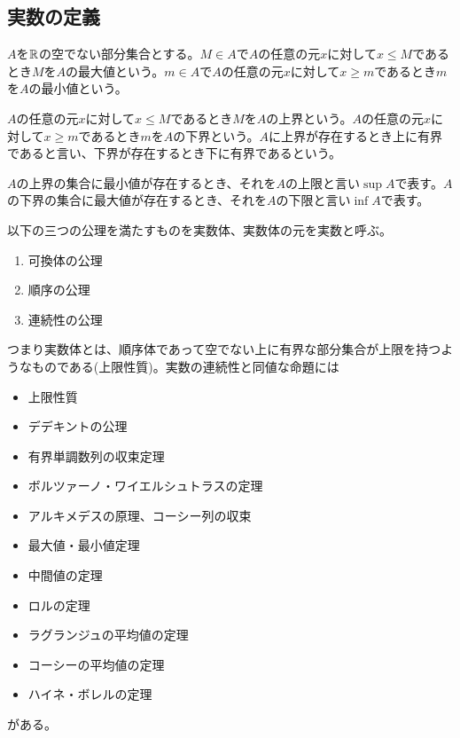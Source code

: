 \subsection{実数の定義}
	\begin{dfn}
		$A$を$\mathbb{R}$の空でない部分集合とする。$M \in A$で$A$の任意の元$x$に対して$x \leq M$であるとき$M$を$A$の最大値という。$m \in A$で$A$の任意の元$x$に対して$x \geq m$であるとき$m$を$A$の最小値という。
	\end{dfn}
	\begin{dfn}[上界・下界]
		$A$の任意の元$x$に対して$x \leq M$であるとき$M$を$A$の上界という。$A$の任意の元$x$に対して$x \geq m$であるとき$m$を$A$の下界という。$A$に上界が存在するとき上に有界であると言い、下界が存在するとき下に有界であるという。
	\end{dfn}
	\begin{dfn}[上限・下限]
		$A$の上界の集合に最小値が存在するとき、それを$A$の上限と言い$\sup A$で表す。$A$の下界の集合に最大値が存在するとき、それを$A$の下限と言い$\inf A$で表す。
	\end{dfn}
	\begin{dfn}[実数]
		以下の三つの公理を満たすものを実数体、実数体の元を実数と呼ぶ。
		\begin{enumerate}
			\item 可換体の公理
			\item 順序の公理
			\item 連続性の公理
		\end{enumerate}
	\end{dfn}
	つまり実数体とは、順序体であって空でない上に有界な部分集合が上限を持つようなものである(上限性質)。実数の連続性と同値な命題には
	\begin{itemize}
		\item 上限性質
		\item デデキントの公理
		\item 有界単調数列の収束定理
		\item ボルツァーノ・ワイエルシュトラスの定理
		\item アルキメデスの原理、コーシー列の収束
		\item 最大値・最小値定理
		\item 中間値の定理
		\item ロルの定理
		\item ラグランジュの平均値の定理
		\item コーシーの平均値の定理
		\item ハイネ・ボレルの定理
	\end{itemize}
	がある。

